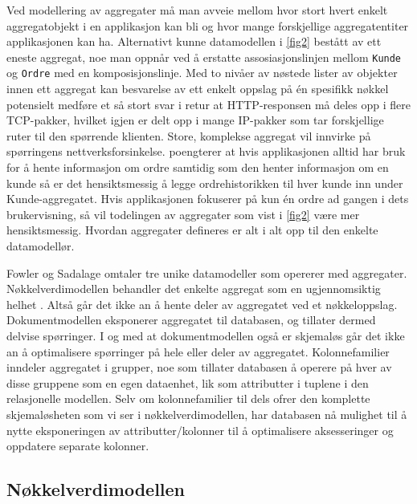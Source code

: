 Ved modellering av aggregater må man avveie mellom hvor stort hvert enkelt aggregatobjekt i en applikasjon kan bli og hvor mange forskjellige aggregatentiter applikasjonen kan ha. Alternativt kunne datamodellen i \ref{fig2} bestått av ett eneste aggregat, noe man oppnår ved å erstatte assosiasjonslinjen mellom \texttt{Kunde} og \texttt{Ordre} med en komposisjonslinje. Med to nivåer av nøstede lister av objekter innen ett aggregat kan besvarelse av ett enkelt oppslag på én spesifikk nøkkel potensielt medføre et så stort svar i retur at HTTP-responsen må deles opp i flere TCP-pakker, hvilket igjen er delt opp i mange IP-pakker som tar forskjellige ruter til den spørrende klienten. Store, komplekse aggregat vil innvirke på spørringens nettverksforsinkelse. \cite{sadalage2013} poengterer at hvis applikasjonen alltid har bruk for å hente informasjon om ordre samtidig som den henter informasjon om en kunde så er det hensiktsmessig å legge ordrehistorikken til hver kunde inn under Kunde-aggregatet. Hvis applikasjonen fokuserer på kun én ordre ad gangen i dets brukervisning, så vil todelingen av aggregater som vist i \ref{fig2} være mer hensiktsmessig. Hvordan aggregater defineres er alt i alt opp til den enkelte datamodellør.

Fowler og Sadalage omtaler tre unike datamodeller som opererer med aggregater. Nøkkelverdimodellen behandler det enkelte aggregat som en ugjennomsiktig helhet \citep{sadalage2013}. Altså går det ikke an å hente deler av aggregatet ved et nøkkeloppslag. Dokumentmodellen eksponerer aggregatet til databasen, og tillater dermed delvise spørringer. I og med at dokumentmodellen også er skjemaløs går det ikke an å optimalisere spørringer på hele eller deler av aggregatet. Kolonnefamilier inndeler aggregatet i grupper, noe som tillater databasen å operere på hver av disse gruppene som en egen dataenhet, lik som attributter i tuplene i den relasjonelle modellen. Selv om kolonnefamilier til dels ofrer den komplette skjemaløsheten som vi ser i nøkkelverdimodellen, har databasen nå mulighet til å nytte eksponeringen av attributter/kolonner til å optimalisere aksesseringer og oppdatere separate kolonner.

\subsection{Nøkkelverdimodellen}


